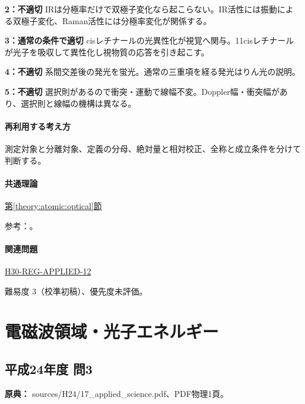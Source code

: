 \noindent\textbf{2：不適切} IRは分極率だけで双極子変化なら起こらない。IR活性には振動による双極子変化、Raman活性には分極率変化が関係する。\par

\noindent\textbf{3：通常の条件で適切} cisレチナールの光異性化が視覚へ関与。11cisレチナールが光子を吸収して異性化し視物質の応答を引き起こす。\par

\noindent\textbf{4：不適切} 系間交差後の発光を蛍光。通常の三重項を経る発光はりん光の説明。\par

\noindent\textbf{5：不適切} 選択則があるので衝突・運動で線幅不変。Doppler幅・衝突幅があり、選択則と線幅の機構は異なる。\par

\paragraph{再利用する考え方} 測定対象と分離対象、定義の分母、絶対量と相対校正、全称と成立条件を分けて判断する。

\paragraph{共通理論} \hyperref[theory:atomic:optical]{第\ref*{theory:atomic:optical}節}

\par 参考：\cite{atomic_ir_co2,atomic_ir_raman,atomic_retinal,atomic_linewidth}。

\paragraph{関連問題} \hyperref[q:h30-reg-applied-12]{H30-REG-APPLIED-12}

\par 難易度 3（校準初稿）、優先度未評価。

\section{電磁波領域・光子エネルギー}

\subsection{平成24年度 問3}
\label{q:h24-reg-applied-03}

\noindent\textbf{原典：} sources/H24/17\_applied\_science.pdf、PDF物理1頁。

